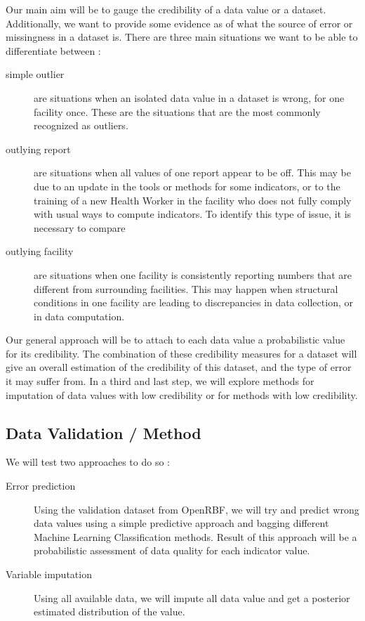 Our main aim will be to gauge the credibility of a data value or a dataset.  Additionally, we want to provide some evidence as of what the source of error or missingness in a dataset is. There are three main situations we want to be able to differentiate between :
\begin{description}
	\item[simple outlier] are situations when an isolated data value in a dataset is wrong, for one facility once. These are the situations that are the most commonly recognized as outliers.
	\item[outlying report] are situations when all values of one report appear to be off. This may be due to an update in the tools or methods for some indicators, or to the training of a new Health Worker in the facility who does not fully comply with usual ways to compute indicators. To identify this type of issue, it is necessary to compare
	\item[outlying facility] are situations when one facility is consistently reporting numbers that are different from surrounding facilities. This may happen when structural conditions in one facility are leading to discrepancies in data collection, or in data computation.
\end{description}

Our general approach will be to attach to each data value a probabilistic value for its credibility. The combination of these credibility measures for a dataset will give an overall estimation of the credibility of this dataset, and the type of error it may suffer from. In a third and last step, we will explore methods for imputation of data values with low credibility or for methods with low credibility.


\subsection{Data Validation / Method}


We will test two approaches to do so :

\begin{description}
	\item[Error prediction] Using the validation dataset from OpenRBF, we will try and predict wrong data values using a simple predictive approach and bagging different Machine Learning Classification methods. Result of this approach will be a probabilistic assessment of data quality for each indicator value.
	\item[Variable imputation] Using all available data, we will impute all data value and get a posterior estimated distribution of the value.
\end{description}

